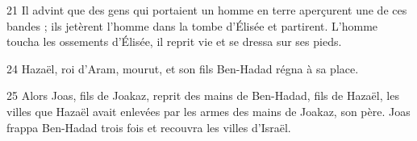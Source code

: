 
21 Il advint que des gens qui portaient un homme en terre aperçurent une de ces bandes ; ils jetèrent l’homme dans la tombe d’Élisée et partirent. L’homme toucha les ossements d’Élisée, il reprit vie et se dressa sur ses pieds.

24 Hazaël, roi d’Aram, mourut, et son fils Ben-Hadad régna à sa place.

25 Alors Joas, fils de Joakaz, reprit des mains de Ben-Hadad, fils de Hazaël, les villes que Hazaël avait enlevées par les armes des mains de Joakaz, son père. Joas frappa Ben-Hadad trois fois et recouvra les villes d’Israël.